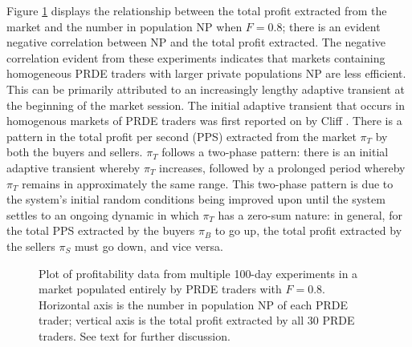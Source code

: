 \documentclass[conference]{IEEEtran}
\begin{document}
Figure \ref{NP_profit} displays the relationship between the total profit extracted from the market and the number in population $\mathrm{NP}$ when $F=0.8$; there is an evident negative correlation between $\mathrm{NP}$ and the total profit extracted.
The negative correlation evident from these experiments indicates that markets containing homogeneous PRDE traders with larger private populations $\mathrm{NP}$ are less efficient.
This can be primarily attributed to an increasingly lengthy adaptive transient at the beginning of the market session.
The initial adaptive transient that occurs in homogenous markets of PRDE traders was first reported on by Cliff \cite{PRDE}.
There is a pattern in the total profit per second (PPS) extracted from the market $\pi_T$ by both the buyers and sellers.
$\pi_T$ follows a two-phase pattern: there is an initial adaptive transient whereby $\pi_T$ increases, followed by a prolonged period whereby $\pi_T$ remains in approximately the same range.
This two-phase pattern is due to the system's initial random conditions being improved upon until the system settles to an ongoing dynamic in which $\pi_T$ has a zero-sum nature: in general, for the total PPS extracted by the buyers $\pi_B$ to go up, the total profit extracted by the sellers $\pi_S$ must go down, and vice versa.

\begin{figure}[htbp]
    \centering
    \caption{
        Plot of profitability data from multiple 100-day experiments in a market populated entirely by PRDE traders with $F=0.8$.
        Horizontal axis is the number in population $\mathrm{NP}$ of each PRDE trader; vertical axis is the total profit extracted by all 30 PRDE traders.
        See text for further discussion.
    }
    \label{NP_profit}
\end{figure}
\end{document}
